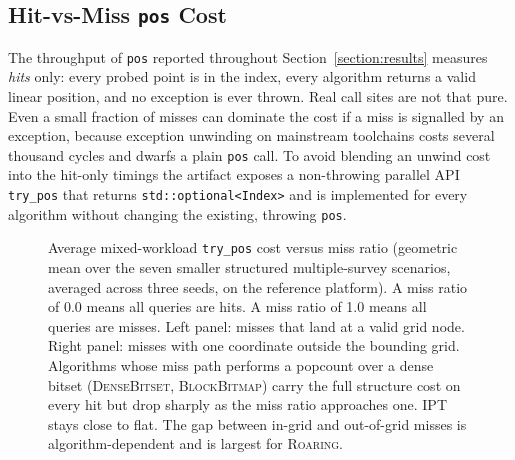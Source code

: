 \documentclass[manuscript,screen,review]{acmart}
\theoremstyle{definition}
\theoremstyle{plain}
\begin{document}
\subsection{Hit-vs-Miss \texttt{pos} Cost}
\label{section:results-pos-mix}

The throughput of \texttt{pos} reported throughout
Section~\ref{section:results} measures \emph{hits} only: every probed
point is in the index, every algorithm returns a valid linear
position, and no exception is ever thrown. Real call sites are not
that pure. Even a small fraction of misses can dominate the cost if a
miss is signalled by an exception, because exception unwinding on
mainstream toolchains costs several thousand cycles and dwarfs a
plain \texttt{pos} call. To avoid blending an unwind cost into the
hit-only timings the artifact exposes a non-throwing parallel API
\texttt{try\_pos} that returns \texttt{std::optional<Index>} and is
implemented for every algorithm without changing the existing,
throwing \texttt{pos}.

\begin{figure}[ht]
\centering

\caption{Average mixed-workload \texttt{try\_pos} cost versus miss
  ratio (geometric mean over the seven smaller structured
  multiple-survey scenarios, averaged across three seeds, on the
  reference platform). A miss ratio of 0.0 means all queries are
  hits. A miss ratio of 1.0 means all queries are misses. Left panel:
  misses that land at a valid grid node. Right panel: misses with one
  coordinate outside the bounding grid. Algorithms whose miss path
  performs a popcount over a dense bitset (\textsc{DenseBitset},
  \textsc{BlockBitmap}) carry the full structure cost on every hit
  but drop sharply as the miss ratio approaches one. IPT stays close
  to flat. The gap between in-grid and out-of-grid misses is
  algorithm-dependent and is largest for \textsc{Roaring}.}
\label{figure:pos-mix-summary}
\end{figure}
\end{document}
